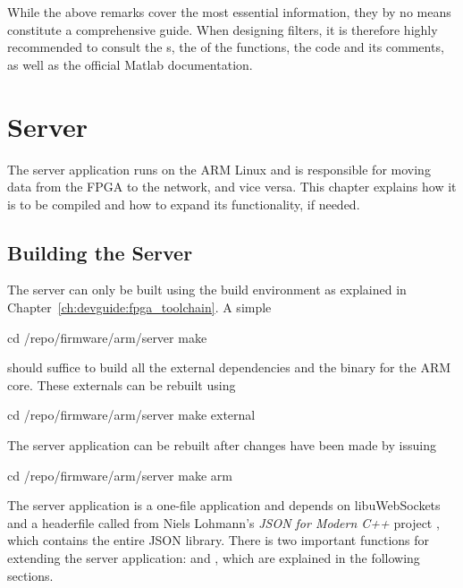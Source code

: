 While the above remarks cover the most essential information, they by no means
constitute  a comprehensive  guide. When  designing filters,  it is  therefore
highly  recommended to  consult  the s,  the   of  the
functions,  the  code  and  its  comments, as  well  as  the  official  Matlab
documentation.

%
%
\chapter{Server} %
\label{ch:devguide:server}

The server application runs on the ARM  Linux and is responsible for moving
data from the FPGA to the network, and vice versa. This chapter explains how
it is to be compiled and how to expand its functionality, if needed.

\section{Building the Server} %
\label{sec:devguide:server:build}

The  server can  only be  built using  the build  environment as  explained in
Chapter~\ref{ch:devguide:fpga_toolchain}.  A simple
\begin{commandshell}
    cd /repo/firmware/arm/server
    make
\end{commandshell}
\noindent should suffice to build all the external dependencies and the binary
for the ARM core. These externals can be rebuilt using
\begin{commandshell}
    cd /repo/firmware/arm/server
    make external
\end{commandshell}
\noindent The server  application can be rebuilt after changes  have been made
by issuing
\begin{commandshell}
    cd /repo/firmware/arm/server
    make arm
\end{commandshell}

The   server  application   is   a  one-file   application   and  depends   on
libuWebSockets~\cite{uws:github} and a  headerfile called  from
Niels Lohmann's \emph{JSON for Modern C++} project \cite{lohmann:github:json},
which contains the entire JSON library.   There is two important functions for
extending the  server application:   and ,
which are explained in the following sections.

